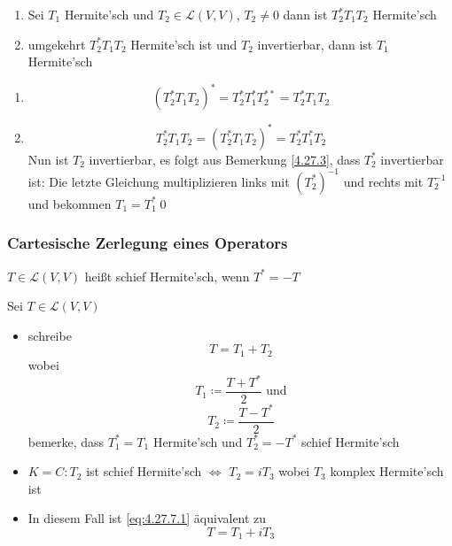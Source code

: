 \begin{subtheorem}
	\begin{enumerate}[label=(\roman*)]
		\item Sei $ T_1 $ Hermite'sch und $ T_2 \in \mathcal{L} (V, V) $, $ T_2 \neq 0 $ dann ist $ T_2^* T_1 T_2 $ Hermite'sch
		\item umgekehrt $ T_2^* T_1 T_2 $ Hermite'sch ist und $ T_2 $ invertierbar, dann ist $ T_1 $ Hermite'sch
	\end{enumerate}
\end{subtheorem}
\begin{subproof*}
	\begin{enumerate}[label=(\roman*)]
		\item \[
				\left( T_2^* T_1 T_2 \right) ^* = T_2^* T_1^* T_2^{* *} = T_2^* T_1 T_2
		\]
	\item 
		\[
			T_2^* T_1 T_2 = \left( T_2^* T_1 T_2 \right) ^* = T_2^* T_1^* T_2
		\]
		Nun ist $ T_2 $ invertierbar, es folgt aus Bemerkung \ref{4.27.3}, dass $ T_2^* $ invertierbar ist:
		Die letzte Gleichung multiplizieren links mit $ \left( T_2^* \right) ^{-1}  $ und rechts mit $ T_2^{-1}  $ und bekommen $ T_1 = T_1^* $\qed
	\end{enumerate}
\end{subproof*}

\subsubsection{Cartesische Zerlegung eines Operators}
\begin{subdefinition}
	$ T \in \mathcal{L} (V, V) $ heißt schief Hermite'sch, wenn $ T^* = - T $
\end{subdefinition}

\begin{subnote}
	Sei $ T \in \mathcal{L} (V, V) $ 
	\begin{itemize}
		\item schreibe
			\begin{equation}
				\label{eq:4.27.7.1}
				\tag{$ \dag $}
				T = T_1 + T_2
			\end{equation}
			wobei
			\[
				T_1 \coloneqq \frac{ T + T^* }{ 2 } \text{ und} 
			\]
			\[
				T_2 \coloneqq \frac{ T - T^* }{ 2 } 
			\]
			bemerke, dass $ T_1^* = T_1 $ Hermite'sch und $ T_2^* = - T^* $ schief Hermite'sch
		\item $ K = C : T_2 $ ist schief Hermite'sch $ \iff $ $ T_2 = i T_3 $ wobei $ T_3 $ komplex Hermite'sch ist
		\item In diesem Fall ist \eqref{eq:4.27.7.1} äquivalent zu
			\[
				T = T_1 + iT_3
			\]
	\end{itemize}
\end{subnote}

